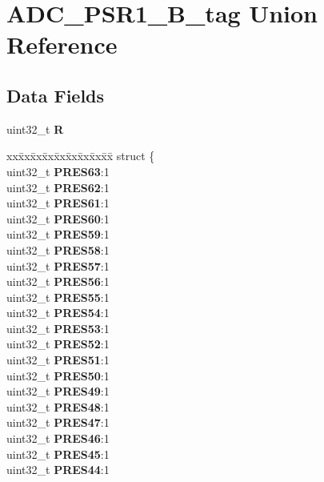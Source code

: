\hypertarget{unionADC__PSR1__32B__tag}{}\section{A\+D\+C\+\_\+\+P\+S\+R1\+\_\+B\+\_\+tag Union Reference}
\label{unionADC__PSR1__32B__tag}
\subsection*{Data Fields}
\begin{DoxyCompactItemize}
\item 
\mbox{\label{unionADC__PSR1__32B__tag_a1c393f100e6f8fdd0301ef46f680f19e}} 
uint32\+\_\+t {\bfseries R}
\item 
\mbox{\label{unionADC__PSR1__32B__tag_a691c9c73dc716719f7d74dd4abfae0e0}} 
\begin{tabbing}
xx\=xx\=xx\=xx\=xx\=xx\=xx\=xx\=xx\=\kill
struct \{\\
\>uint32\_t {\bfseries PRES63}:1\\
\>uint32\_t {\bfseries PRES62}:1\\
\>uint32\_t {\bfseries PRES61}:1\\
\>uint32\_t {\bfseries PRES60}:1\\
\>uint32\_t {\bfseries PRES59}:1\\
\>uint32\_t {\bfseries PRES58}:1\\
\>uint32\_t {\bfseries PRES57}:1\\
\>uint32\_t {\bfseries PRES56}:1\\
\>uint32\_t {\bfseries PRES55}:1\\
\>uint32\_t {\bfseries PRES54}:1\\
\>uint32\_t {\bfseries PRES53}:1\\
\>uint32\_t {\bfseries PRES52}:1\\
\>uint32\_t {\bfseries PRES51}:1\\
\>uint32\_t {\bfseries PRES50}:1\\
\>uint32\_t {\bfseries PRES49}:1\\
\>uint32\_t {\bfseries PRES48}:1\\
\>uint32\_t {\bfseries PRES47}:1\\
\>uint32\_t {\bfseries PRES46}:1\\
\>uint32\_t {\bfseries PRES45}:1\\
\>uint32\_t {\bfseries PRES44}:1\\

\end{tabbing}
\end{DoxyCompactItemize}
